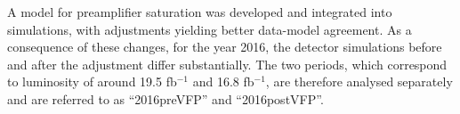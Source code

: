 A model for preamplifier saturation was developed and integrated into simulations, with adjustments yielding better data-model agreement.
As a consequence of these changes, for the year 2016, the detector simulations before and after the adjustment differ substantially.
The two periods, which correspond to luminosity of around 19.5 fb$^{-1}$ and 16.8 fb$^{-1}$,
are therefore analysed separately and are referred to as ``2016preVFP'' and ``2016postVFP''.
